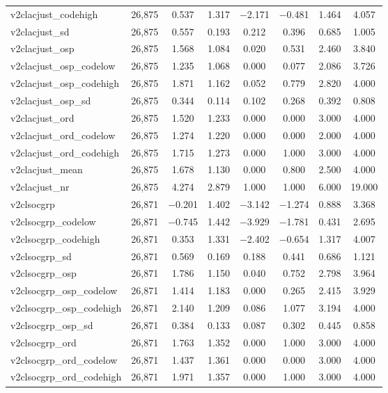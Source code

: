 \begin{table}[!htbp]
\begin{tabular}{@{\extracolsep{5pt}}lccccccc}
v2clacjust\_codehigh & 26,875 & 0.537 & 1.317 & $-$2.171 & $-$0.481 & 1.464 & 4.057 \\ 
v2clacjust\_sd & 26,875 & 0.557 & 0.193 & 0.212 & 0.396 & 0.685 & 1.005 \\ 
v2clacjust\_osp & 26,875 & 1.568 & 1.084 & 0.020 & 0.531 & 2.460 & 3.840 \\ 
v2clacjust\_osp\_codelow & 26,875 & 1.235 & 1.068 & 0.000 & 0.077 & 2.086 & 3.726 \\ 
v2clacjust\_osp\_codehigh & 26,875 & 1.871 & 1.162 & 0.052 & 0.779 & 2.820 & 4.000 \\ 
v2clacjust\_osp\_sd & 26,875 & 0.344 & 0.114 & 0.102 & 0.268 & 0.392 & 0.808 \\ 
v2clacjust\_ord & 26,875 & 1.520 & 1.233 & 0.000 & 0.000 & 3.000 & 4.000 \\ 
v2clacjust\_ord\_codelow & 26,875 & 1.274 & 1.220 & 0.000 & 0.000 & 2.000 & 4.000 \\ 
v2clacjust\_ord\_codehigh & 26,875 & 1.715 & 1.273 & 0.000 & 1.000 & 3.000 & 4.000 \\ 
v2clacjust\_mean & 26,875 & 1.678 & 1.130 & 0.000 & 0.800 & 2.500 & 4.000 \\ 
v2clacjust\_nr & 26,875 & 4.274 & 2.879 & 1.000 & 1.000 & 6.000 & 19.000 \\ 
v2clsocgrp & 26,871 & $-$0.201 & 1.402 & $-$3.142 & $-$1.274 & 0.888 & 3.368 \\ 
v2clsocgrp\_codelow & 26,871 & $-$0.745 & 1.442 & $-$3.929 & $-$1.781 & 0.431 & 2.695 \\ 
v2clsocgrp\_codehigh & 26,871 & 0.353 & 1.331 & $-$2.402 & $-$0.654 & 1.317 & 4.007 \\ 
v2clsocgrp\_sd & 26,871 & 0.569 & 0.169 & 0.188 & 0.441 & 0.686 & 1.121 \\ 
v2clsocgrp\_osp & 26,871 & 1.786 & 1.150 & 0.040 & 0.752 & 2.798 & 3.964 \\ 
v2clsocgrp\_osp\_codelow & 26,871 & 1.414 & 1.183 & 0.000 & 0.265 & 2.415 & 3.929 \\ 
v2clsocgrp\_osp\_codehigh & 26,871 & 2.140 & 1.209 & 0.086 & 1.077 & 3.194 & 4.000 \\ 
v2clsocgrp\_osp\_sd & 26,871 & 0.384 & 0.133 & 0.087 & 0.302 & 0.445 & 0.858 \\ 
v2clsocgrp\_ord & 26,871 & 1.763 & 1.352 & 0.000 & 1.000 & 3.000 & 4.000 \\ 
v2clsocgrp\_ord\_codelow & 26,871 & 1.437 & 1.361 & 0.000 & 0.000 & 3.000 & 4.000 \\ 
v2clsocgrp\_ord\_codehigh & 26,871 & 1.971 & 1.357 & 0.000 & 1.000 & 3.000 & 4.000 \\ 

\end{tabular}
\end{table}
